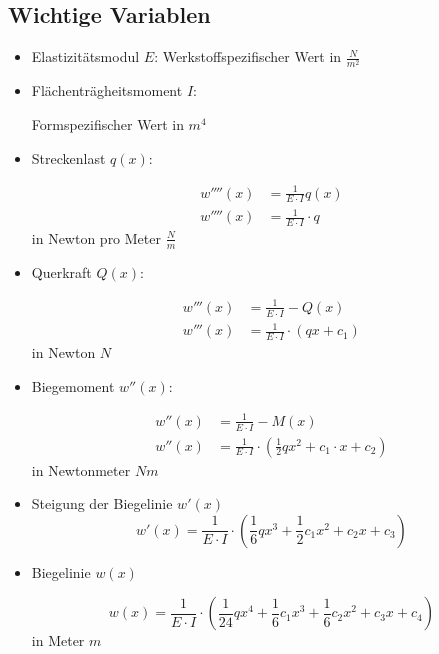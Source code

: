 \documentclass[a4paper,12pt]{article}
\begin{document}
\subsection{Wichtige Variablen}
\begin{itemize}
\item Elastizitätsmodul $E$:
	\subitem Werkstoffspezifischer Wert in $\frac{N}{m^2}$
\item Flächenträgheitsmoment $I$:
	\subitem \parbox[t]{\linewidth}{
	Formspezifischer Wert in $m^4$}
\item Streckenlast $q(x)$:
	\subitem \parbox[t]{\linewidth}{
	\begin{equation*}
	\begin{split}
	w''''(x) & = \frac{1}{E \cdot I}q(x)\\
	w''''(x) & = \frac{1}{E \cdot I} \cdot q
	\end{split}
	\end{equation*}
	in Newton pro Meter $\frac{N}{m}$}
\item Querkraft $Q(x)$:
	\subitem \parbox[t]{\linewidth}{
	\begin{equation*}
	\begin{split}
	w'''(x) & = \frac{1}{E \cdot I}-Q(x)\\
	w'''(x) & = \frac{1}{E \cdot I}\cdot (qx + c_1)
	\end{split}
	\end{equation*}
	in Newton $N$}
\item Biegemoment $w''(x)$:
	\subitem \parbox[t]{\linewidth}{
	\begin{equation*}
	\begin{split}
	w''(x) & = \frac{1}{E \cdot I}-M(x)\\
	w''(x) & = \frac{1}{E \cdot I}\cdot (\frac{1}{2} qx^2 + c_1 \cdot x + c_2)
	\end{split}
	\end{equation*}
	in Newtonmeter $Nm$}
\item Steigung der Biegelinie $w'(x)$
	\subitem $$w'(x) = \frac{1}{E \cdot I}\cdot (\frac{1}{6} qx^3 + \frac{1}{2} c_1x^2 + c_2x + c_3)$$
\item Biegelinie $w(x)$
	\subitem \parbox[t]{\linewidth}{ 
	$$w(x) = \frac{1}{E \cdot I}\cdot (\frac{1}{24} qx^4 + \frac{1}{6} c_1x^3 + \frac{1}{6} c_2x^2 + c_3x + c_4)$$
	in Meter $m$}
\end{itemize}
\end{document}
